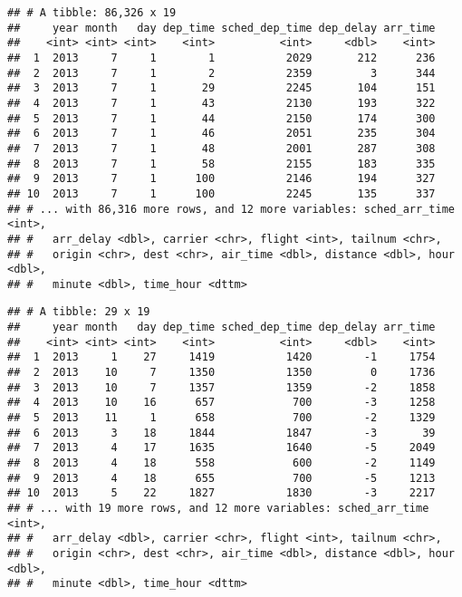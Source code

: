 \documentclass[]{article}
\newenvironment{Shaded}{\begin{snugshade}}{\end{snugshade}}
\newcommand{\KeywordTok}[1]{\textcolor[rgb]{0.13,0.29,0.53}{\textbf{#1}}}
\newcommand{\DecValTok}[1]{\textcolor[rgb]{0.00,0.00,0.81}{#1}}
\newcommand{\StringTok}[1]{\textcolor[rgb]{0.31,0.60,0.02}{#1}}
\newcommand{\CommentTok}[1]{\textcolor[rgb]{0.56,0.35,0.01}{\textit{#1}}}
\newcommand{\OperatorTok}[1]{\textcolor[rgb]{0.81,0.36,0.00}{\textbf{#1}}}
\newcommand{\NormalTok}[1]{#1}
\begin{document}
\begin{verbatim}
## # A tibble: 86,326 x 19
##     year month   day dep_time sched_dep_time dep_delay arr_time
##    <int> <int> <int>    <int>          <int>     <dbl>    <int>
##  1  2013     7     1        1           2029       212      236
##  2  2013     7     1        2           2359         3      344
##  3  2013     7     1       29           2245       104      151
##  4  2013     7     1       43           2130       193      322
##  5  2013     7     1       44           2150       174      300
##  6  2013     7     1       46           2051       235      304
##  7  2013     7     1       48           2001       287      308
##  8  2013     7     1       58           2155       183      335
##  9  2013     7     1      100           2146       194      327
## 10  2013     7     1      100           2245       135      337
## # ... with 86,316 more rows, and 12 more variables: sched_arr_time <int>,
## #   arr_delay <dbl>, carrier <chr>, flight <int>, tailnum <chr>,
## #   origin <chr>, dest <chr>, air_time <dbl>, distance <dbl>, hour <dbl>,
## #   minute <dbl>, time_hour <dttm>
\end{verbatim}

\begin{Shaded}
\end{Shaded}

\begin{verbatim}
## # A tibble: 29 x 19
##     year month   day dep_time sched_dep_time dep_delay arr_time
##    <int> <int> <int>    <int>          <int>     <dbl>    <int>
##  1  2013     1    27     1419           1420        -1     1754
##  2  2013    10     7     1350           1350         0     1736
##  3  2013    10     7     1357           1359        -2     1858
##  4  2013    10    16      657            700        -3     1258
##  5  2013    11     1      658            700        -2     1329
##  6  2013     3    18     1844           1847        -3       39
##  7  2013     4    17     1635           1640        -5     2049
##  8  2013     4    18      558            600        -2     1149
##  9  2013     4    18      655            700        -5     1213
## 10  2013     5    22     1827           1830        -3     2217
## # ... with 19 more rows, and 12 more variables: sched_arr_time <int>,
## #   arr_delay <dbl>, carrier <chr>, flight <int>, tailnum <chr>,
## #   origin <chr>, dest <chr>, air_time <dbl>, distance <dbl>, hour <dbl>,
## #   minute <dbl>, time_hour <dttm>
\end{verbatim}
\end{document}
